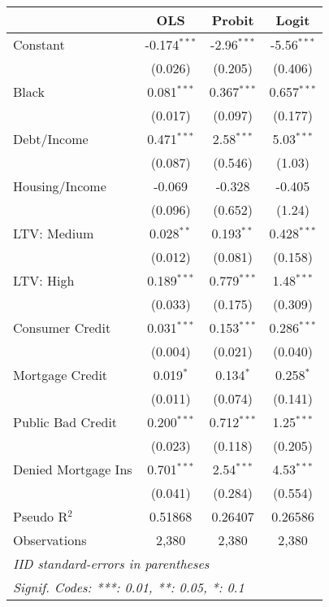 
   \begin{tabular}{lccc}
      \toprule
                          &  OLS           & Probit        & Logit\\  
      \midrule
      Constant            & -0.174$^{***}$ & -2.96$^{***}$ & -5.56$^{***}$\\   
                          & (0.026)        & (0.205)       & (0.406)\\   
      Black               & 0.081$^{***}$  & 0.367$^{***}$ & 0.657$^{***}$\\   
                          & (0.017)        & (0.097)       & (0.177)\\   
      Debt/Income         & 0.471$^{***}$  & 2.58$^{***}$  & 5.03$^{***}$\\   
                          & (0.087)        & (0.546)       & (1.03)\\   
      Housing/Income      & -0.069         & -0.328        & -0.405\\   
                          & (0.096)        & (0.652)       & (1.24)\\   
      LTV: Medium         & 0.028$^{**}$   & 0.193$^{**}$  & 0.428$^{***}$\\   
                          & (0.012)        & (0.081)       & (0.158)\\   
      LTV: High           & 0.189$^{***}$  & 0.779$^{***}$ & 1.48$^{***}$\\   
                          & (0.033)        & (0.175)       & (0.309)\\   
      Consumer Credit     & 0.031$^{***}$  & 0.153$^{***}$ & 0.286$^{***}$\\   
                          & (0.004)        & (0.021)       & (0.040)\\   
      Mortgage Credit     & 0.019$^{*}$    & 0.134$^{*}$   & 0.258$^{*}$\\   
                          & (0.011)        & (0.074)       & (0.141)\\   
      Public Bad Credit   & 0.200$^{***}$  & 0.712$^{***}$ & 1.25$^{***}$\\   
                          & (0.023)        & (0.118)       & (0.205)\\   
      Denied Mortgage Ins & 0.701$^{***}$  & 2.54$^{***}$  & 4.53$^{***}$\\   
                          & (0.041)        & (0.284)       & (0.554)\\   
      \midrule
      Pseudo R$^2$        & 0.51868        & 0.26407       & 0.26586\\  
      Observations        & 2,380          & 2,380         & 2,380\\  
      \bottomrule
      \multicolumn{4}{l}{\emph{IID standard-errors in parentheses}}\\
      \multicolumn{4}{l}{\emph{Signif. Codes: ***: 0.01, **: 0.05, *: 0.1}}\\
   \end{tabular}
